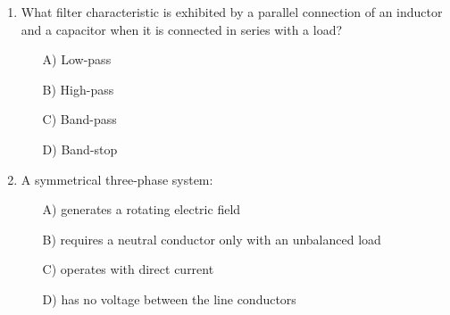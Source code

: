 \documentclass[a4paper,12pt]{article}
\newif\ifshowsolutions
\begin{document}
\begin{enumerate}[label=\textbf{\arabic*.}, leftmargin=*, itemsep=8pt]
\ifshowsolutions
Solution: A
\fi

  \item What filter characteristic is exhibited by a parallel connection of an inductor and a capacitor when it is connected in series with a load?
    \begin{itemize}[label=$\square$]
      \item[A)] Low-pass
      \item[B)] High-pass
      \item[C)] Band-pass
      \item[D)] Band-stop
    \end{itemize}

\ifshowsolutions
Solution: D
\fi

  \item A symmetrical three-phase system:
    \begin{itemize}[label=$\square$]
      \item[A)] generates a rotating electric field
      \item[B)] requires a neutral conductor only with an unbalanced load
      \item[C)] operates with direct current
      \item[D)] has no voltage between the line conductors
    \end{itemize}

\ifshowsolutions
Solution: B
\fi

\end{enumerate}
\end{document}
